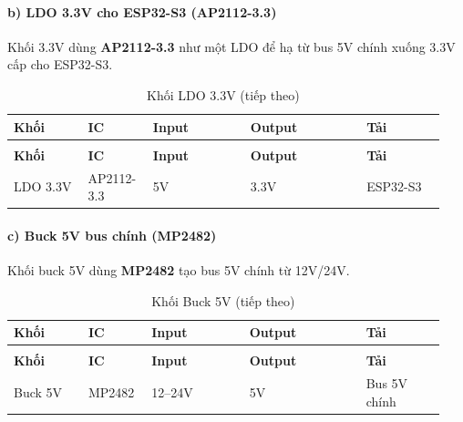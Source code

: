 \documentclass[a4paper]{extarticle}
\newcommand{\thesissettableid}[2]{%
  \renewcommand{\thetable}{#1}%
  \renewcommand{\theHtable}{#2}%
}
\begin{document}
\paragraph{b) LDO 3.3V cho ESP32-S3 (AP2112-3.3)}\label{b-buck-33v-cho-esp32-s3-xl1509-33e}

Khối 3.3V dùng \textbf{AP2112-3.3} như một LDO để hạ từ bus 5V chính xuống
3.3V cấp cho ESP32-S3.


{\thesissettableid{4.2}{tab-ch4-khoi-buck-3-3v}
\def\LTcaptype{table}
\begin{longtable}{|L{0.168\linewidth}|L{0.132\linewidth}|L{0.218\linewidth}|L{0.250\linewidth}|L{0.176\linewidth}|}
\caption{Khối LDO 3.3V}\label{tab:ch4-khoi-buck-3-3v}\\
\hline \textbf{Khối} & \textbf{IC} & \textbf{Input} & \textbf{Output} & \textbf{Tải} \\
\hline
\endfirsthead
\caption[]{Khối LDO 3.3V (tiếp theo)}\\
\hline \textbf{Khối} & \textbf{IC} & \textbf{Input} & \textbf{Output} & \textbf{Tải} \\
\hline
\endhead
\hline
\endfoot
\endlastfoot
LDO 3.3V & AP2112-3.3 & 5V & 3.3V & ESP32-S3 \\\hline
\end{longtable}
}


\paragraph{c) Buck 5V bus chính
(MP2482)}\label{c-buck-5v-bus-chuxednh-mp2482}

Khối buck 5V dùng \textbf{MP2482} tạo bus 5V chính từ 12V/24V.


{\thesissettableid{4.3}{tab-ch4-khoi-buck-5v}
\def\LTcaptype{table}
\begin{longtable}{|L{0.168\linewidth}|L{0.132\linewidth}|L{0.218\linewidth}|L{0.250\linewidth}|L{0.176\linewidth}|}
\caption{Khối Buck 5V}\label{tab:ch4-khoi-buck-5v}\\
\hline \textbf{Khối} & \textbf{IC} & \textbf{Input} & \textbf{Output} & \textbf{Tải} \\
\hline
\endfirsthead
\caption[]{Khối Buck 5V (tiếp theo)}\\
\hline \textbf{Khối} & \textbf{IC} & \textbf{Input} & \textbf{Output} & \textbf{Tải} \\
\hline
\endhead
\hline
\endfoot
\endlastfoot
Buck 5V & MP2482 & 12--24V & 5V & Bus 5V chính \\\hline
\end{longtable}
}
\end{document}
